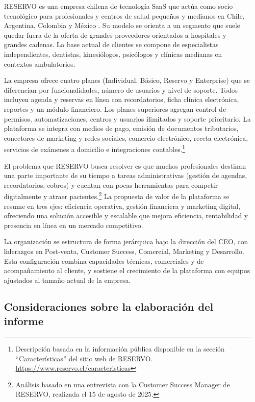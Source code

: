 RESERVO es una empresa chilena de tecnología SaaS que actúa como socio tecnológico para profesionales y centros de salud pequeños y medianos en Chile, Argentina, Colombia y México \citep{ReservoQuienesSomos2025}. Su modelo se orienta a un segmento que suele quedar fuera de la oferta de grandes proveedores orientados a hospitales y grandes cadenas. La base actual de clientes se compone de especialistas independientes, dentistas, kinesiólogos, psicólogos y clínicas medianas en contextos ambulatorios.

La empresa ofrece cuatro planes (Individual, Básico, Reservo y Enterprise) que se diferencian por funcionalidades, número de usuarios y nivel de soporte. Todos incluyen agenda y reservas en línea con recordatorios, ficha clínica electrónica, reportes y un módulo financiero. Los planes superiores agregan control de permisos, automatizaciones, centros y usuarios ilimitados y soporte prioritario. La plataforma se integra con medios de pago, emisión de documentos tributarios, conectores de marketing y redes sociales, comercio electrónico, receta electrónica, servicios de exámenes a domicilio e integraciones contables.\footnote{Descripción basada en la información pública disponible en la sección ``Características'' del sitio web de RESERVO. \url{https://www.reservo.cl/caracteristicas}}

El problema que RESERVO busca resolver es que muchos profesionales destinan una parte importante de su tiempo a tareas administrativas (gestión de agendas, recordatorios, cobros) y cuentan con pocas herramientas para competir digitalmente y atraer pacientes.\footnote{Análisis basado en una entrevista con la Customer Success Manager de RESERVO, realizada el 15 de agosto de 2025.} La propuesta de valor de la plataforma se resume en tres ejes: eficiencia operativa, gestión financiera y marketing digital, ofreciendo una solución accesible y escalable que mejora eficiencia, rentabilidad y presencia en línea en un mercado competitivo.

La organización se estructura de forma jerárquica bajo la dirección del CEO, con liderazgos en Post-venta, Customer Success, Comercial, Marketing y Desarrollo. Esta configuración combina capacidades técnicas, comerciales y de acompañamiento al cliente, y sostiene el crecimiento de la plataforma con equipos ajustados al tamaño actual de la empresa.

\subsection{Consideraciones sobre la elaboración del informe}

